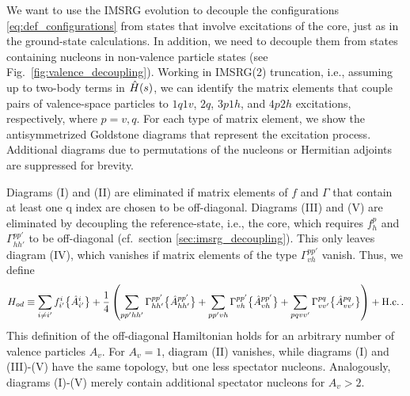 {We want to use the IMSRG evolution to decouple the configurations
\eqref{eq:def_configurations} from states that involve excitations 
of the core, just as in the ground-state calculations. In addition, 
we need to decouple them from states containing nucleons in non-valence 
particle states (see Fig.~\ref{fig:valence_decoupling}). Working in 
IMSRG(2) truncation, i.e., assuming up to two-body terms in $\hat{H}(s)$, 
we can identify the matrix elements that couple pairs of valence-space 
particles to $1q1v$, $2q$, $3p1h$, and $4p2h$ excitations, respectively, 
where $p=v,q$. For each type of matrix element, we show the antisymmetrized 
Goldstone diagrams \cite{Shavitt:2009} that represent the excitation process. 
Additional diagrams due to permutations of the nucleons or Hermitian 
adjoints are suppressed for brevity.

Diagrams (I) and (II) are eliminated if matrix elements of $f$ and 
$\Gamma$ that contain at least one q index are chosen to be off-diagonal. 
Diagrams (III) and (V) are eliminated by decoupling the reference-state, i.e.,
the core, which requires $f^{p}_{h}$ and $\Gamma^{pp'}_{hh'}$ to be off-diagonal 
(cf.~section \ref{sec:imsrg_decoupling}). This only leaves diagram (IV), 
which vanishes if matrix elements of the type $\Gamma^{pp'}_{vh}$ 
vanish. Thus, we define \cite{Tsukiyama:2012fk,Hergert:2017kx}
\begin{equation}\label{eq:def_Hod}
  H_{od} \equiv \sum_{i\neq i'}f^{i}_{i'}\nord{\AO^{i}_{i'}}
           + \frac{1}{4}\left(\sum_{pp'hh'}\Gamma^{pp'}_{hh'}\nord{\AO^{pp'}_{hh'}}
           + \sum_{pp'vh}\Gamma^{pp'}_{vh}\nord{\AO^{pp'}_{vh}}
           + \sum_{pqvv'}\Gamma^{pq}_{vv'}\nord{\AO^{pq}_{vv'}}\right)
           + \text{H.c.}\,.
\end{equation}
This definition of the off-diagonal Hamiltonian holds for an arbitrary
number of valence particles $A_v$. For $A_v=1$, diagram (II) vanishes, 
while diagrams (I) and (III)-(V) have the same topology, but one 
less spectator nucleons. Analogously, diagrams (I)-(V) merely contain 
additional spectator nucleons for $A_v>2$.


}
